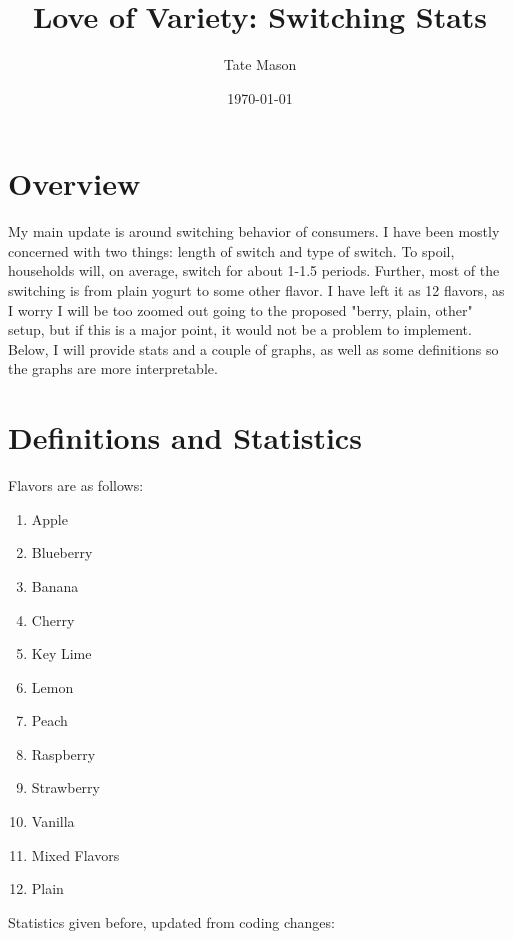 \documentclass[11pt]{article}
\title{Love of Variety: Switching Stats}
\author{Tate Mason}
\date{\today}
\theoremstyle{definition}
\theoremstyle{remark}
\begin{document}
\maketitle
\thispagestyle{empty}

\section{Overview}

My main update is around switching behavior of consumers. I have been mostly
concerned with two things: length of switch and type of switch. To spoil, households will,
on average, switch for about 1-1.5 periods. Further, most of the switching is
from plain yogurt to some other flavor. I have left it as 12 flavors, as I worry
I will be too zoomed out going to the proposed "berry, plain, other" setup, but
if this is a major point, it would not be a problem to implement. Below, I will
provide stats and a couple of graphs, as well as some definitions so the graphs
are more interpretable. 

\section{Definitions and Statistics}

Flavors are as follows:

\begin{centering}
  \begin{enumerate}
    \item Apple
    \item Blueberry
    \item Banana
    \item Cherry
    \item Key Lime
    \item Lemon
    \item Peach
    \item Raspberry
    \item Strawberry
    \item Vanilla
    \item Mixed Flavors
    \item Plain
  \end{enumerate}
\end{centering}

Statistics given before, updated from coding changes:
\end{document}
